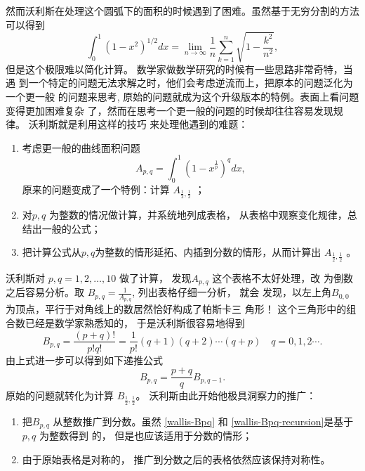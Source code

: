 {然而沃利斯在处理这个圆弧下的面积的时候遇到了困难。虽然基于无穷分割的方法可以得到 
$$ \int_0^1 (1-x^2)^{1/2} dx = \lim_{n\rightarrow \infty} \frac{1}{n} \sum^n_{k=1} \sqrt{1-\frac{k^2}{n^2}} ,$$ 
但是这个极限难以简化计算。 数学家做数学研究的时候有一些思路非常奇特，当遇
到一个特定的问题无法求解之时，他们会考虑逆流而上，把原本的问题泛化为一个更一般
的问题来思考, 原始的问题就成为这个升级版本的特例。表面上看问题变得更加困难复杂
了，然而在思考一个更一般的问题的时候却往往容易发现规律。 沃利斯就是利用这样的技巧
来处理他遇到的难题：

\begin{enumerate}
\item 考虑更一般的曲线面积问题
$$ A_{p,q} = \int_0^1 (1-x^\frac{1}{p})^q dx ,$$ 
原来的问题变成了一个特例：计算 $A_{\frac{1}{2},\frac{1}{2}}$ ；

\item 对$p,q$ 为整数的情况做计算，并系统地列成表格， 从表格中观察变化规律，总结出一般的公式；
\item 把计算公式从$p,q$为整数的情形延拓、内插到分数的情形，从而计算出
$A_{\frac{1}{2},\frac{1}{2}}$ 。
\end{enumerate}

沃利斯对 $p,q = 1,2,\ldots,10$ 做了计算， 发现$A_{p,q}$ 这个表格不太好处理，改
为倒数之后容易分析。取 $B_{p,q} = \frac{1}{A_{p,q}}$, 列出表格仔细一分析， 就会
发现，以左上角$B_{0,0}$ 为顶点，平行于对角线上的数居然恰好构成了帕斯卡三
角形！ 这个三角形中的组合数已经是数学家熟悉知的， 于是沃利斯很容易地得到
\begin{equation}
\label{wallis-Bpq}
B_{p,q} = \frac{(p+q)!} {p! q!} = \frac{1}{p!} (q+1) (q+2) \cdots (q+p) \quad q=0,1,2 \cdots .
\end{equation}
由上式进一步可以得到如下递推公式
\begin{equation}
\label{wallis-Bpq-recursion}
B_{p,q} = \frac{p+q}{q} B_{p,q-1} .
\end{equation}
原始的问题就转化为计算 $B_{\frac{1}{2},\frac{1}{2}}$。 沃利斯由此开始他极具洞察力的推广：
\begin{enumerate}
\item 把$B_{p,q}$ 从整数推广到分数。虽然 \eqref{wallis-Bpq} 和 \eqref{wallis-Bpq-recursion}是基于$p,q$ 为整数得到
的， 但是也应该适用于分数的情形；
\item 由于原始表格是对称的， 推广到分数之后的表格依然应该保持对称性。
\end{enumerate}

}
